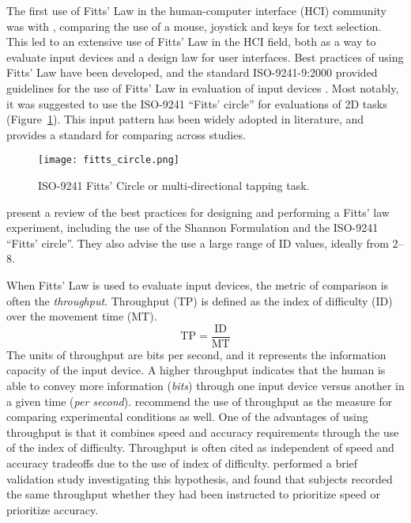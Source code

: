 The first use of Fitts' Law in the human-computer interface (HCI) community was with \citet{card_evaluation_1978}, comparing the use of a mouse, joystick and keys for text selection.
This led to an extensive use of Fitts' Law in the HCI field, both as a way to evaluate input devices and a design law for user interfaces.
Best practices of using Fitts' Law have been developed, and the standard ISO-9241-9:2000 provided guidelines for the use of Fitts' Law in evaluation of input devices \citep{international_organization_for_standardization_iso_2000}.
Most notably, it was suggested to use the ISO-9241 ``Fitts' circle'' for evaluations of 2D tasks (Figure~\ref{fig:intro_fitts_circle}).
This input pattern has been widely adopted in literature, and provides a standard for comparing across studies.

\begin{figure}
    \centering
    \texttt{[image: fitts\_circle.png]}
    \caption{ISO-9241 Fitts' Circle or multi-directional tapping task.}
    \label{fig:intro_fitts_circle}
\end{figure}

\citet{soukoreff_towards_2004} present a review of the best practices for designing and performing a Fitts' law experiment, including the use of the Shannon Formulation and the ISO-9241 ``Fitts' circle''.
They also advise the use a large range of ID values, ideally from \SIrange{2}{8}{\bits}.

When Fitts' Law is used to evaluate input devices, the metric of comparison is often the \emph{throughput}.
Throughput (TP) is defined as the index of difficulty (ID) over the movement time (MT).
\begin{equation}
    \mathrm{TP} = \frac{\text{ID}}{\text{MT}}
\end{equation}
The units of throughput are bits per second, and it represents the information capacity of the input device.
A higher throughput indicates that the human is able to convey more information (\emph{bits}) through one input device versus another in a given time (\emph{per second}).
\citet{soukoreff_towards_2004} recommend the use of throughput as the measure for comparing experimental conditions as well.
One of the advantages of using throughput is that it combines speed and accuracy requirements through the use of the index of difficulty.
Throughput is often cited as independent of speed and accuracy tradeoffs due to the use of index of difficulty.
\citet{mackenzie_fitts_2008} performed a brief validation study investigating this hypothesis, and found that subjects recorded the same throughput whether they had been instructed to prioritize speed or prioritize accuracy.

